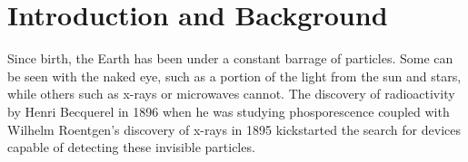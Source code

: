 \chapter{Introduction and Background}

Since birth, the Earth has been under a constant barrage of particles.
Some can be seen with the naked eye, such as a portion of the light from the sun and stars, while others such as x-rays or microwaves cannot.
The discovery of radioactivity by Henri Becquerel in 1896 when he was studying phosporescence \cite{Mould} coupled with Wilhelm Roentgen's discovery of x-rays in 1895 \cite{wilhelm} kickstarted the search for devices capable of detecting these invisible particles.

